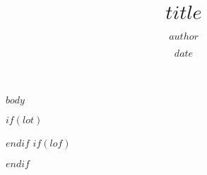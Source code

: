 \documentclass[
]{article}
\title{$title$}
\author{$author$}
\date{$date$}
\begin{document}
\maketitle

{
\hypersetup{}
\setcounter{tocdepth}{$toc-depth$}
\tableofcontents
}

$body$

$if(lot)$
\listoftables
$endif$
$if(lof)$
\listoffigures
$endif$
\end{document}
